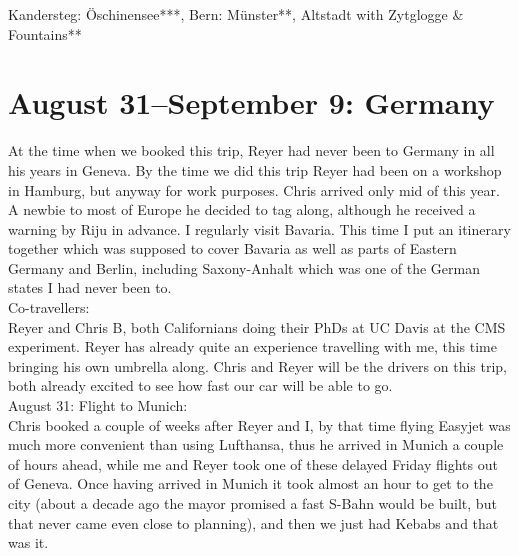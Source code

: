 Kandersteg: \"Oschinensee***, Bern: M\"unster**, Altstadt with Zytglogge \& Fountains**

\section{August 31--September 9: Germany}
\label{Germany2018}

At the time when we booked this trip, Reyer had never been to Germany in all his years in Geneva. By the time we did this trip Reyer had been on a workshop in Hamburg, but anyway for work purposes. Chris arrived only mid of this year. A newbie to most of Europe he decided to tag along, although he received a warning by Riju in advance. I regularly visit Bavaria. This time I put an itinerary together which was supposed to cover Bavaria as well as parts of Eastern Germany and Berlin, including Saxony-Anhalt which was one of the German states I had never been to.\\

Co-travellers:\\
Reyer and Chris B, both Californians doing their PhDs at UC Davis at the CMS experiment. Reyer has already quite an experience travelling with me, this time bringing his own umbrella along. Chris and Reyer will be the drivers on this trip, both already excited to see how fast our car will be able to go.\\

August 31: Flight to Munich:\\
Chris booked a couple of weeks after Reyer and I, by that time flying Easyjet was much more convenient than using Lufthansa, thus he arrived in Munich a couple of hours ahead, while me and Reyer took one of these delayed Friday flights out of Geneva. Once having arrived in Munich it took almost an hour to get to the city (about a decade ago the mayor promised a fast S-Bahn would be built, but that never came even close to planning), and then we just had Kebabs and that was it.\\

